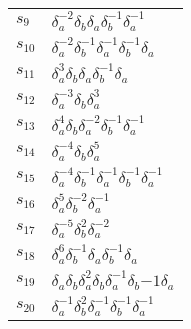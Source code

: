 \documentclass{article}
\begin{document}
\begin{center}
\begin{tabular}{ll}
$s_{9}$ & $\delta_a^{-2}\delta_b^{}\delta_a^{}\delta_b^{-1}\delta_a^{-1}$ \\
$s_{10}$ & $\delta_a^{-2}\delta_b^{-1}\delta_a^{-1}\delta_b^{-1}\delta_a^{}$ \\
$s_{11}$ & $\delta_a^{3}\delta_b^{}\delta_a^{}\delta_b^{-1}\delta_a^{}$ \\
$s_{12}$ & $\delta_a^{-3}\delta_b^{}\delta_a^{3}$ \\
$s_{13}$ & $\delta_a^{4}\delta_b^{}\delta_a^{-2}\delta_b^{-1}\delta_a^{-1}$ \\
$s_{14}$ & $\delta_a^{-4}\delta_b^{}\delta_a^{5}$ \\
$s_{15}$ & $\delta_a^{-4}\delta_b^{-1}\delta_a^{-1}\delta_b^{-1}\delta_a^{-1}$ 
\\
$s_{16}$ & $\delta_a^{5}\delta_b^{-2}\delta_a^{-1}$ \\
$s_{17}$ & $\delta_a^{-5}\delta_b^{2}\delta_a^{-2}$ \\
$s_{18}$ & $\delta_a^{6}\delta_b^{-1}\delta_a^{}\delta_b^{-1}\delta_a^{}$ \\
$s_{19}$ & $\delta_a^{}\delta_b^{}\delta_a^{2}\delta_b^{}\delta_a^{-1}\delta_b^\
{-1}\delta_a^{}$ \\
$s_{20}$ & $\delta_a^{-1}\delta_b^{2}\delta_a^{-1}\delta_b^{-1}\delta_a^{-1}$ \\
\bottomrule
\end{tabular}
\end{center}

\thispagestyle{empty}
\end{document}
